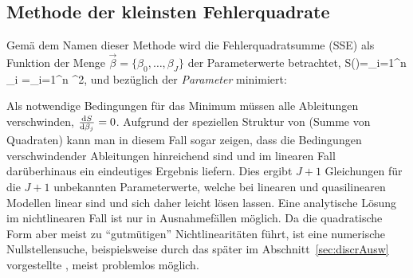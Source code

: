 \subsection{\label{sec:OLS}Methode der kleinsten Fehlerquadrate}

Gem\"a\3 dem Namen dieser Methode
wird die Fehlerquadratsumme (SSE) als Funktion der 
Menge $\vec{\beta}=\{\beta_0, \ldots, \beta_J\}$ der Parameterwerte 
betrachtet,
\be
\label{Fallg}
S(\vec{\beta})=\sum\limits_{i=1}^n \epsilon_i
=\sum\limits_{i=1}^n 
^2,
\ee
und bez\"uglich der \emph{Parameter}  minimiert:




%
Als notwendige Bedingungen f\"ur das Minimum m\"ussen alle Ableitungen
verschwinden, $\frac{{\textrm d} S}{{\textrm d} \beta_j}=0$. Aufgrund der speziellen Struktur
von  (Summe von Quadraten) kann man in diesem Fall sogar
zeigen, dass die Bedingungen verschwindender Ableitungen hinreichend
sind und im linearen Fall dar\"uberhinaus ein eindeutiges Ergebnis
liefern.
Dies ergibt $J+1$ Gleichungen f\"ur die $J+1$ unbekannten
Parameterwerte, welche bei linearen und quasilinearen Modellen linear
sind und sich daher leicht l\"osen lassen. Eine
analytische L\"osung im nichtlinearen Fall 
ist nur in Ausnahmef\"allen m\"oglich. Da die quadratische Form aber
meist zu ``gutm\"utigen'' Nichtlinearit\"aten f\"uhrt, ist  eine
numerische Nullstellensuche, beispielsweise  durch das
sp\"ater im Abschnitt~\ref{sec:discrAusw} vorgestellte 
, meist problemlos m\"oglich.

